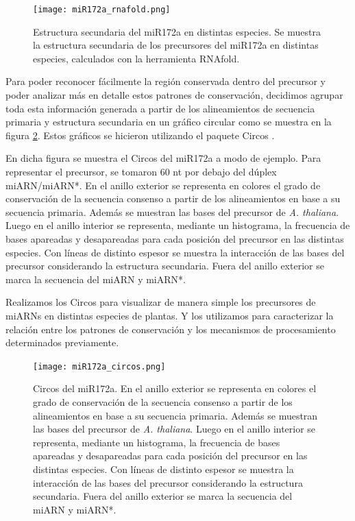 \begin{landscape}
    \begin{figure}[htbp!] 
        \centering    
        \texttt{[image: miR172a\_rnafold.png]}
        \caption[Estructura secundaria del miR172a en distintas especies]{
        Estructura secundaria del miR172a en distintas especies.
        Se muestra la estructura secundaria de los precursores del miR172a en distintas especies, calculados con la herramienta RNAfold.
        }
        \label{fig:miR172a_rnafold}
    \end{figure}
\end{landscape}

Para poder reconocer fácilmente la región conservada dentro del precursor y poder analizar más en detalle estos patrones de conservación, decidimos agrupar toda esta información
 generada a partir de los alineamientos de secuencia primaria y estructura secundaria en un gráfico circular como se muestra en la figura \ref{fig:miR172a_circos}.
Estos gráficos se hicieron utilizando el paquete Circos \citep{pmid19541911}.
 
En dicha figura se muestra el Circos del miR172a a modo de ejemplo.
Para representar el precursor, se tomaron 60 nt por debajo del dúplex miARN/miARN*.
En el anillo exterior se representa en colores el grado de conservación de la secuencia consenso a partir de los alineamientos en base a su secuencia primaria.
Además se muestran las bases del precursor de \textit {A. thaliana}.
Luego en el anillo interior se representa, mediante un histograma, la frecuencia de bases apareadas y desapareadas para cada posición del precursor en las distintas especies.
Con líneas de distinto espesor se muestra la interacción de las bases del precursor considerando la estructura secundaria. 
Fuera del anillo exterior se marca la secuencia del miARN y miARN*.

Realizamos los Circos para visualizar de manera simple los precursores de miARNs en distintas especies de plantas.
Y los utilizamos para caracterizar la relación entre los patrones de conservación y los mecanismos de procesamiento determinados previamente.


\begin{figure}[htbp!] 
    \centering    
    \texttt{[image: miR172a\_circos.png]}
    \caption[Circos del miR172a]{Circos del miR172a.
En el anillo exterior se representa en colores el grado de conservación de la secuencia consenso a partir de los alineamientos en base a su secuencia primaria.
Además se muestran las bases del precursor de \textit {A. thaliana}.
Luego en el anillo interior se representa, mediante un histograma, la frecuencia de bases apareadas y desapareadas para cada posición del precursor en las distintas especies.
Con líneas de distinto espesor se muestra la interacción de las bases del precursor considerando la estructura secundaria. 
Fuera del anillo exterior se marca la secuencia del miARN y miARN*.
   }
     \label{fig:miR172a_circos}
\end{figure}

